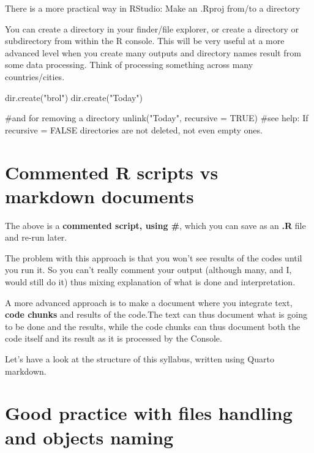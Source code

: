 \documentclass[
  letterpaper,
  DIV=11,
  numbers=noendperiod]{scrreprt}
\newenvironment{Shaded}{\begin{snugshade}}{\end{snugshade}}
\newcommand{\AttributeTok}[1]{\textcolor[rgb]{0.40,0.45,0.13}{#1}}
\newcommand{\CommentTok}[1]{\textcolor[rgb]{0.37,0.37,0.37}{#1}}
\newcommand{\ConstantTok}[1]{\textcolor[rgb]{0.56,0.35,0.01}{#1}}
\newcommand{\FunctionTok}[1]{\textcolor[rgb]{0.28,0.35,0.67}{#1}}
\newcommand{\NormalTok}[1]{\textcolor[rgb]{0.00,0.23,0.31}{#1}}
\newcommand{\StringTok}[1]{\textcolor[rgb]{0.13,0.47,0.30}{#1}}
\begin{document}
There is a more practical way in RStudio: Make an .Rproj from/to a
directory

You can create a directory in your finder/file explorer, or create a
directory or subdirectory from within the R console. This will be very
useful at a more advanced level when you create many outputs and
directory names result from some data processing. Think of processing
something across many countries/cities.

\begin{Shaded}
\begin{Highlighting}[]
\FunctionTok{dir.create}\NormalTok{(}\StringTok{"brol"}\NormalTok{)}
\FunctionTok{dir.create}\NormalTok{(}\StringTok{"Today"}\NormalTok{)}

\CommentTok{\#and for removing a directory}
\FunctionTok{unlink}\NormalTok{(}\StringTok{"Today"}\NormalTok{, }\AttributeTok{recursive =} \ConstantTok{TRUE}\NormalTok{) }\CommentTok{\#see help: If recursive = FALSE directories are not deleted, not even empty ones. }
\end{Highlighting}
\end{Shaded}

\section{Commented R scripts vs markdown
documents}\label{commented-r-scripts-vs-markdown-documents}

The above is a \textbf{commented script, using \#}, which you can save
as an \textbf{.R} file and re-run later.

The problem with this approach is that you won't see results of the
codes until you run it. So you can't really comment your output
(although many, and I, would still do it) thus mixing explanation of
what is done and interpretation.

A more advanced approach is to make a document where you integrate text,
\textbf{code chunks} and results of the code.The text can thus document
what is going to be done and the results, while the code chunks can thus
document both the code itself and its result as it is processed by the
Console.

Let's have a look at the structure of this syllabus, written using
Quarto markdown.

\section{Good practice with files handling and objects
naming}\label{good-practice-with-files-handling-and-objects-naming}
\end{document}
